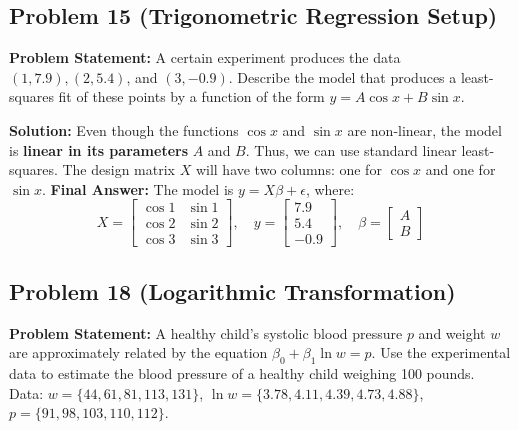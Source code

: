 \documentclass[11pt, letterpaper]{article}
\theoremstyle{definition}
\theoremstyle{remark}
\begin{document}
\subsection*{Problem 15 (Trigonometric Regression Setup)}
\textbf{Problem Statement:} A certain experiment produces the data $(1, 7.9), (2, 5.4)$, and $(3, -0.9)$. Describe the model that produces a least-squares fit of these points by a function of the form $y = A \cos x + B \sin x$.

\textbf{Solution:}
Even though the functions $\cos x$ and $\sin x$ are non-linear, the model is \textbf{linear in its parameters} $A$ and $B$. Thus, we can use standard linear least-squares. The design matrix $X$ will have two columns: one for $\cos x$ and one for $\sin x$.
\textbf{Final Answer:}
The model is $y = X\beta + \epsilon$, where:
\[
X = \begin{bmatrix} \cos 1 & \sin 1 \\ \cos 2 & \sin 2 \\ \cos 3 & \sin 3 \end{bmatrix}, \quad y = \begin{bmatrix} 7.9 \\ 5.4 \\ -0.9 \end{bmatrix}, \quad \beta = \begin{bmatrix} A \\ B \end{bmatrix}
\]

\subsection*{Problem 18 (Logarithmic Transformation)}
\textbf{Problem Statement:} A healthy child's systolic blood pressure $p$ and weight $w$ are approximately related by the equation $\beta_0 + \beta_1 \ln w = p$. Use the experimental data to estimate the blood pressure of a healthy child weighing 100 pounds. Data: $w = \{44, 61, 81, 113, 131\}$, $\ln w = \{3.78, 4.11, 4.39, 4.73, 4.88\}$, $p = \{91, 98, 103, 110, 112\}$.
\end{document}
